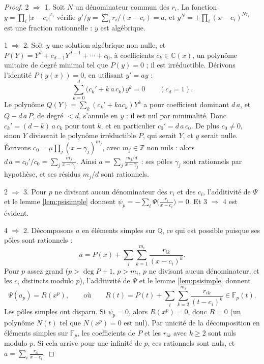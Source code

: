 \documentclass[11pt,a4paper]{article}
\theoremstyle{plain}
\theoremstyle{definition}
\theoremstyle{remark}
\newcommand{\Q}{\mathbb{Q}}
\newcommand{\C}{\mathbb{C}}
\newcommand{\Z}{\mathbb{Z}}
\newcommand{\F}{\mathbb{F}}
\begin{document}
\begin{proof}
2 $\Rightarrow$ 1. Soit $N$ un dénominateur commun des $r_i$. La fonction $y = \prod_i |x - c_i|^{r_i}$ vérifie $y'/y = \sum_i r_i/(x-c_i) = a$, et $y^N = \pm\prod_i (x-c_i)^{N r_i}$ est une fraction rationnelle : $y$ est algébrique.

1 $\Rightarrow$ 2. Soit $y$ une solution algébrique non nulle, et $P(Y) = Y^d + c_{d-1}Y^{d-1} + \cdots + c_0$, à coefficients $c_k \in \C(x)$, un polynôme unitaire de degré minimal tel que $P(y) = 0$ ; il est irréductible. Dérivons l'identité $P(y(x)) = 0$, en utilisant $y' = ay$ :
\[
  \sum_{k=0}^d \big(c_k' + k\,a\,c_k\big)\, y^k = 0 \qquad (c_d = 1) .
\]
Le polynôme $Q(Y) = \sum_k (c_k' + k a c_k) Y^k$ a pour coefficient dominant $d\,a$, et $Q - d\,a\,P$, de degré $< d$, s'annule en $y$ : il est nul par minimalité. Donc $c_k' = (d-k)\,a\,c_k$ pour tout $k$, et en particulier $c_0' = d\,a\,c_0$. De plus $c_0 \neq 0$, sinon $Y$ diviserait le polynôme irréductible $P$, qui serait $Y$, et $y$ serait nulle. Écrivons $c_0 = \mu \prod_j (x - \gamma_j)^{m_j}$, avec $m_j \in \Z$ non nuls : alors $d\,a = c_0'/c_0 = \sum_j \frac{m_j}{x - \gamma_j}$. Ainsi $a = \sum_j \frac{m_j/d}{x-\gamma_j}$ : ses pôles $\gamma_j$ sont rationnels par hypothèse, et ses résidus $m_j/d$ sont rationnels.

2 $\Rightarrow$ 3. Pour $p$ ne divisant aucun dénominateur des $r_i$ et des $c_i$, l'additivité de $\Psi$ et le lemme \ref{lem:psisimple} donnent $\psi_p = -\sum_i \Psi\big(\frac{r_i}{x-c_i}\big) = 0$. Et 3 $\Rightarrow$ 4 est évident.

4 $\Rightarrow$ 2. Décomposons $a$ en éléments simples sur $\Q$, ce qui est possible puisque ses pôles sont rationnels :
\[
  a = P(x) + \sum_i \sum_{k=1}^{m_i} \frac{r_{ik}}{(x - c_i)^k} .
\]
Pour $p$ assez grand ($p > \deg P + 1$, $p > m_i$, $p$ ne divisant aucun dénominateur, et les $c_i$ distincts modulo $p$), l'additivité de $\Psi$ et le lemme \ref{lem:psisimple} donnent
\[
  \Psi(a_p) = R(x^p), \qquad\text{où}\qquad R(t) = P(t) + \sum_i \sum_{k=2}^{m_i} \frac{r_{ik}}{(t - c_i)^k} \in \F_p(t) .
\]
Les pôles simples ont disparu. Si $\psi_p = 0$, alors $R(x^p) = 0$, donc $R = 0$ (un polynôme $N(t)$ tel que $N(x^p) = 0$ est nul). Par unicité de la décomposition en éléments simples sur $\F_p$, les coefficients de $P$ et les $r_{ik}$ avec $k \geq 2$ sont nuls modulo $p$. Si cela arrive pour une infinité de $p$, ces rationnels sont nuls, et $a = \sum_i \frac{r_{i1}}{x - c_i}$.
\end{proof}
\end{document}
